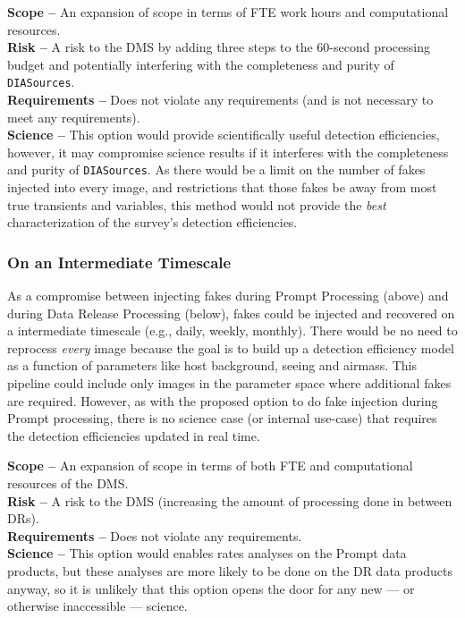 {\bf Scope --} An expansion of scope in terms of FTE work hours and computational resources. \\
{\bf Risk --} A risk to the DMS by adding three steps to the 60-second processing budget and potentially interfering with the completeness and purity of {\tt DIASources}. \\
{\bf Requirements --} Does not violate any requirements (and is not necessary to meet any requirements). \\
{\bf Science --} This option would provide scientifically useful detection efficiencies, however, it may compromise science results if it interferes with the completeness and purity of {\tt DIASources}. As there would be a limit on the number of fakes injected into every image, and restrictions that those fakes be away from most true transients and variables, this method would not provide the {\it best} characterization of the survey's detection efficiencies.

\subsubsection{On an Intermediate Timescale}\label{sssec:opts_fakeswhen_int}

As a compromise between injecting fakes during Prompt Processing (above) and during Data Release Processing (below), fakes could be injected and recovered on a intermediate timescale (e.g., daily, weekly, monthly). There would be no need to reprocess {\it every} image because the goal is to build up a detection efficiency model as a function of parameters like host background, seeing and airmass. This pipeline could include only images in the parameter space where additional fakes are required. However, as with the proposed option to do fake injection during Prompt processing, there is no science case (or internal use-case) that requires the detection efficiencies updated in real time.  

{\bf Scope --} An expansion of scope in terms of both FTE and computational resources of the DMS. \\
{\bf Risk --} A risk to the DMS (increasing the amount of processing done in between DRs). \\
{\bf Requirements --} Does not violate any requirements. \\
{\bf Science --} This option would enables rates analyses on the Prompt data products, but these analyses are more likely to be done on the DR data products anyway, so it is unlikely that this option opens the door for any new --- or otherwise inaccessible --- science. 

